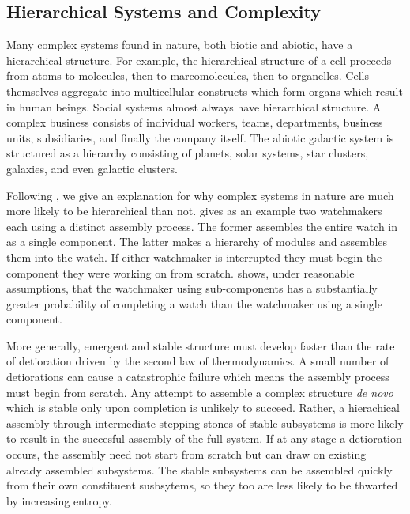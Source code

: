 \subsection{Hierarchical Systems and Complexity}

Many complex systems found in nature, both biotic and abiotic, have a
hierarchical structure. For example, the hierarchical structure of a cell
proceeds from atoms to molecules, then to marcomolecules, then
to organelles. Cells themselves aggregate into multicellular constructs which form
organs which result in human beings. Social systems almost always have
hierarchical structure. A complex business consists of individual workers,
teams, departments, business units, subsidiaries, and finally the company itself.
The abiotic galactic system is structured as a hierarchy consisting of
planets, solar systems, star clusters, galaxies, and even galactic clusters.

Following \citet{simon1991architecture}, we give an explanation for why complex
systems in nature are much more likely to be hierarchical than not.
\citet{simon1991architecture} gives as an example two watchmakers each using a
distinct assembly process. The former assembles the entire watch in as a single
component. The latter makes a hierarchy of modules and assembles them into the
watch. If either watchmaker is interrupted they must begin the component they
were working on from scratch. \citet{simon1991architecture} shows, under
reasonable assumptions, that the watchmaker using sub-components has a
substantially greater probability of completing a watch than the watchmaker
using a single component.

More generally, emergent and stable structure must develop faster than the rate
of detioration driven by the second law of thermodynamics. A small number of
detiorations can cause a catastrophic failure which means the assembly process
must begin from scratch. Any attempt to assemble a complex structure \emph{de
novo} which is stable only upon completion is unlikely to succeed. Rather, a
hierachical assembly through intermediate stepping stones of stable subsystems
is more likely to result in the succesful assembly of the full system. If at
any stage a detioration occurs, the assembly need not start from scratch but
can draw on existing already assembled subsystems. The stable subsystems can be
assembled quickly from their own constituent susbsytems, so they too are less
likely to be thwarted by increasing entropy.

